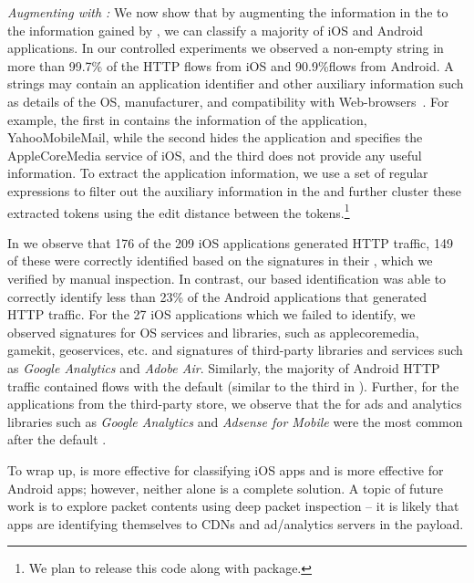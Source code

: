\emph{Augmenting with \useragent: } We now show that by augmenting the information in the \useragent to the information gained by \httphost, we can classify a majority of iOS and Android applications. 
In our controlled experiments we observed a non-empty \useragent string in more than 99.7\% of the HTTP flows from iOS and 90.9\%flows from Android. 
A \useragent strings may contain an application identifier and other auxiliary information such as details of the OS, manufacturer, and compatibility with Web-browsers~\cite{mozilla:useragentdetection}. 
For example, the first \useragent in  contains the information of the application, YahooMobileMail, while the second \useragent hides the application and specifies the AppleCoreMedia service of iOS, and the third does not provide any useful information. 
To extract the application information, we use a set of regular expressions to filter out the auxiliary information in the \useragent and further cluster these extracted tokens using the edit distance between the tokens.\footnote{We plan to release this code along with \platname package.}

In  we observe that 176 of the 209 iOS applications generated HTTP traffic, 149 of these were correctly identified based on the signatures in their \useragent, which we verified by manual inspection.
In contrast, our \useragent based identification was able to correctly identify less than 23\% of the Android applications that generated HTTP traffic. 
For the 27 iOS applications which we failed to identify, we observed signatures for OS services and libraries, such as applecoremedia, gamekit, geoservices, etc. and signatures of third-party libraries and services such as \emph{Google Analytics} and \emph{Adobe Air}.
Similarly, the majority of Android HTTP traffic contained flows with the default \useragent (similar to the third \useragent in ).
Further, for the applications from the third-party store, we observe that the \useragent for ads and analytics libraries such as \emph{Google Analytics} and \emph{Adsense for Mobile} were the most common \useragent after the default \useragent.

To wrap up, \useragent is more effective for classifying iOS apps and \httphost is more effective for Android apps; however, neither alone is a complete 
solution. A topic of future work is to explore packet contents using deep packet inspection -- it is likely that apps are identifying themselves to CDNs and 
ad/analytics servers in the payload. 

